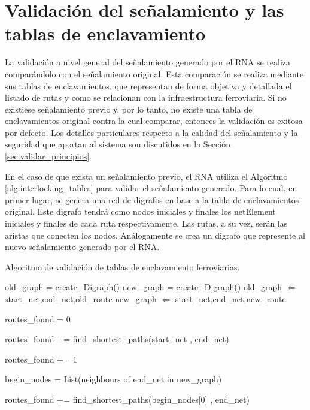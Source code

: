 \section{Validación del señalamiento y las tablas de enclavamiento}

	La validación a nivel general del señalamiento generado por el RNA se realiza comparándolo con el señalamiento original. Esta comparación se realiza mediante sus tablas de enclavamientos, que representan de forma objetiva y detallada el listado de rutas y como se relacionan con la infraestructura ferroviaria. Si no existiese señalamiento previo y, por lo tanto, no existe una tabla de enclavamientos original contra la cual comparar, entonces la validación es exitosa por defecto. Los detalles particulares respecto a la calidad del señalamiento y la seguridad que aportan al sistema son discutidos en la Sección \ref{sec:validar_principios}.
	
	En el caso de que exista un señalamiento previo, el RNA utiliza el Algoritmo \ref{alg:interlocking_tables} para validar el señalamiento generado. Para lo cual, en primer lugar, se genera una red de digrafos en base a la tabla de enclavamientos original. Este digrafo tendrá como nodos iniciales y finales los netElement iniciales y finales de cada ruta respectivamente. Las rutas, a su vez, serán las aristas que conecten los nodos. Análogamente se crea un digrafo que represente al nuevo señalamiento generado por el RNA.
	
	\begin{algorithm}[hbt!]
		\caption{Algoritmo de validación de tablas de enclavamiento ferroviarias.}\label{alg:interlocking_tables}
		\DontPrintSemicolon
		\SetNoFillComment
		\LinesNotNumbered 
		old\_graph = create\_Digraph()\; 
		new\_graph = create\_Digraph()\; 
		{
			old\_graph $\Leftarrow$ start\_net,end\_net,old\_route\;
		}
		{
			new\_graph $\Leftarrow$ start\_net,end\_net,new\_route\;
		}
		
		routes\_found = 0\;
		{
			{
				routes\_found += find\_shortest\_paths(start\_net , end\_net)\;
			}
			\Else
			{
				{
					routes\_found += 1\;
				}
				\Else
				{
					{
						begin\_nodes = List(neighbours of end\_net in new\_graph)\;
						
						{
							routes\_found += find\_shortest\_paths(begin\_nodes[0] , end\_net)\;
						}
					}
				}
			}
		
		}

	\end{algorithm}
	
